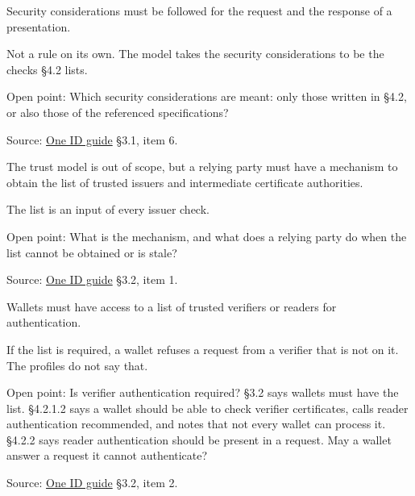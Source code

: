 \begin{definition}
  \label{def:c14}
  \notready
  Security considerations must be followed for the request and the response
  of a presentation.

  Not a rule on its own. The model takes the security considerations to be
  the checks §4.2 lists.

  Open point: Which security considerations are meant: only those written in
  §4.2, or also those of the referenced specifications?

  Source:
  \href{https://standards.atlassian.net/wiki/spaces/OneID/pages/2947416082/Technical+Implementation+Guide}{One
  ID guide} §3.1, item 6.
\end{definition}

\begin{definition}
  \label{def:c15}
  \notready
  The trust model is out of scope, but a relying party must have a mechanism
  to obtain the list of trusted issuers and intermediate certificate
  authorities.

  The list is an input of every issuer check.

  Open point: What is the mechanism, and what does a relying party do when
  the list cannot be obtained or is stale?

  Source:
  \href{https://standards.atlassian.net/wiki/spaces/OneID/pages/2947416082/Technical+Implementation+Guide}{One
  ID guide} §3.2, item 1.
\end{definition}

\begin{definition}
  \label{def:c16}
  \notready
  Wallets must have access to a list of trusted verifiers or readers for
  authentication.

  If the list is required, a wallet refuses a request from a verifier that is
  not on it. The profiles do not say that.

  Open point: Is verifier authentication required? §3.2 says wallets must
  have the list. §4.2.1.2 says a wallet should be able to check verifier
  certificates, calls reader authentication recommended, and notes that not
  every wallet can process it. §4.2.2 says reader authentication should be
  present in a request. May a wallet answer a request it cannot authenticate?

  Source:
  \href{https://standards.atlassian.net/wiki/spaces/OneID/pages/2947416082/Technical+Implementation+Guide}{One
  ID guide} §3.2, item 2.
\end{definition}

